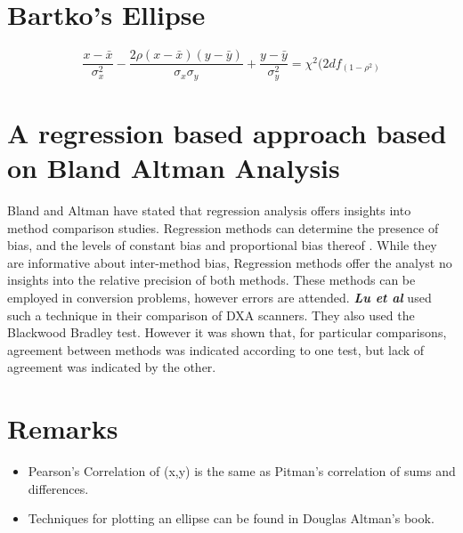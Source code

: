 \documentclass[12pt, a4paper]{report}
\theoremstyle{plain}
\theoremstyle{definition}
\theoremstyle{remark}
\begin{document}
	
	
	
	
	
	\section*{Bartko's Ellipse}
	
	\[ \frac{x - \bar{x}}{\sigma^2_x} - \frac{2\rho(x - \bar{x})(y - \bar{y})}{\sigma_x \sigma_y} + \frac{y - \bar{y}}{\sigma^2_y} = \chi^2(2df_(1-\rho^2) \]
	
	

	\section{A regression based approach based on Bland Altman Analysis}
	Bland and Altman have stated that regression analysis offers insights into method comparison studies. Regression methods can determine the presence of bias, and the levels of constant bias and proportional bias thereof \cite{ludbrook97,ludbrook02}.
	While they are informative about inter-method bias, Regression methods offer the analyst no insights into the relative precision of both methods. These methods can be employed in conversion problems, however errors are
	attended.
	\emph{\textbf{Lu et al}} used such a technique in their comparison of DXA scanners. They also used the Blackwood Bradley test. However it was shown that, for particular comparisons, agreement between methods was indicated according to one test, but lack of agreement was indicated by the other.
	
	
	\section*{Remarks}
	\begin{itemize}
		\item Pearson's Correlation of (x,y) is the same as Pitman's correlation of sums and differences.
		
		\item Techniques for plotting an ellipse can be found in Douglas Altman's book.
	\end{itemize}
\end{document}
